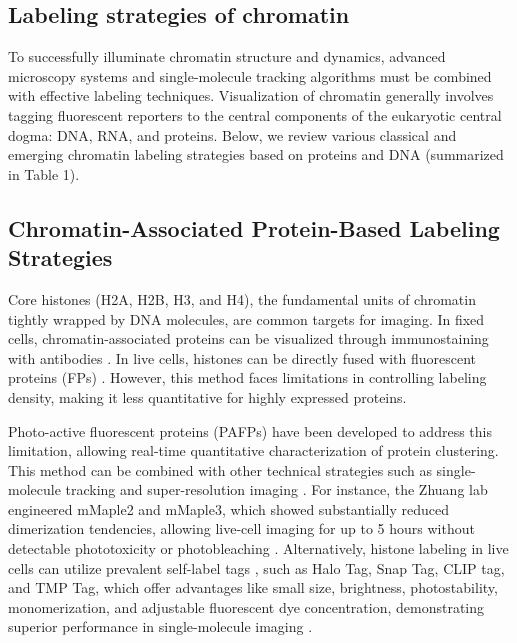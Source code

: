 \subsection{Labeling strategies of chromatin}

To successfully illuminate chromatin structure and dynamics, advanced microscopy systems and single-molecule tracking algorithms must be combined with effective labeling techniques. Visualization of chromatin generally involves tagging fluorescent reporters to the central components of the eukaryotic central dogma: DNA, RNA, and proteins. Below, we review various classical and emerging chromatin labeling strategies based on proteins and DNA (summarized in Table 1).

\subsection{Chromatin-Associated Protein-Based Labeling Strategies}

Core histones (H2A, H2B, H3, and H4), the fundamental units of chromatin tightly wrapped by DNA molecules, are common targets for imaging. In fixed cells, chromatin-associated proteins can be visualized through immunostaining with antibodies \parencite{Conic2018,Ricci2015,Xu2018}. In live cells, histones can be directly fused with fluorescent proteins (FPs) \parencite{Belmont2001,Das2003,Kanda1998}. However, this method faces limitations in controlling labeling density, making it less quantitative for highly expressed proteins.

Photo-active fluorescent proteins (PAFPs) have been developed to address this limitation, allowing real-time quantitative characterization of protein clustering. This method can be combined with other technical strategies such as single-molecule tracking and super-resolution imaging \parencite{Cisse2013,Manley2008,Nozaki2017}. For instance, the Zhuang lab engineered mMaple2 and mMaple3, which showed substantially reduced dimerization tendencies, allowing live-cell imaging for up to 5 hours without detectable phototoxicity or photobleaching \parencite{Wang2014,Baker2010}. Alternatively, histone labeling in live cells can utilize prevalent self-label tags \parencite{Liss2015,Stagge2013}, such as Halo Tag, Snap Tag, CLIP tag, and TMP Tag, which offer advantages like small size, brightness, photostability, monomerization, and adjustable fluorescent dye concentration, demonstrating superior performance in single-molecule imaging \parencite{Grimm2017,Nagashima2019,Nozaki2017}.

